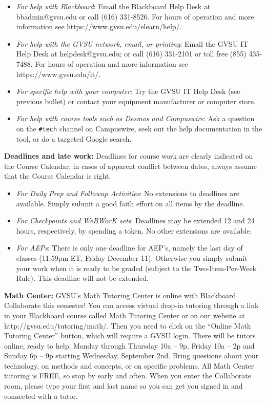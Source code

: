 \documentclass[]{article}
\providecommand{\tightlist}{%
  \setlength{\itemsep}{0pt}\setlength{\parskip}{0pt}}
\begin{document}
\begin{itemize}
\tightlist
\item
  \emph{For help with Blackboard}: Email the Blackboard Help Desk at
  bbadmin@gvsu.edu or call (616) 331-8526. For hours of operation and
  more information see https://www.gvsu.edu/elearn/help/.
\item
  \emph{For help with the GVSU network, email, or printing}: Email the
  GVSU IT Help Desk at helpdesk@gvsu.edu; or call (616) 331-2101 or toll
  free (855) 435-7488. For hours of operation and more information see
  https://www.gvsu.edu/it/.
\item
  \emph{For specific help with your computer}: Try the GVSU IT Help Desk
  (see previous bullet) or contact your equipment manufacturer or
  computer store.
\item
  \emph{For help with course tools such as Desmos and Campuswire}: Ask a
  question on the \texttt{\#tech} channel on Campuswire, seek out the
  help documentation in the tool, or do a targeted Google search.
\end{itemize}

\textbf{Deadlines and late work:} Deadlines for course work are clearly
indicated on the Course Calendar; in cases of apparent conflict between
dates, always assume that the Course Calendar is right.

\begin{itemize}
\tightlist
\item
  \emph{For Daily Prep and Followup Activities}: No extensions to
  deadlines are available. Simply submit a good faith effort on all
  items by the deadline.
\item
  \emph{For Checkpoints and WeBWorK sets}: Deadlines may be extended 12
  and 24 hours, respectively, by spending a token. No other extensions
  are available.
\item
  \emph{For AEPs}: There is only one deadline for AEP's, namely the last
  day of classes (11:59pm ET, Friday December 11). Otherwise you simply
  submit your work when it is ready to be graded (subject to the
  Two-Item-Per-Week Rule). This deadline will not be extended.
\end{itemize}

\textbf{Math Center:} GVSU's Math Tutoring Center is online with
Blackboard Collaborate this semester! You can access virtual drop-in
tutoring through a link in your Blackboard course called Math Tutoring
Center or on our website at http://gvsu.edu/tutoring/math/. Then you
need to click on the ``Online Math Tutoring Center'' button, which will
require a GVSU login. There will be tutors online, ready to help, Monday
through Thursday 10a -- 9p, Friday 10a -- 2p and Sunday 6p -- 9p
starting Wednesday, September 2nd. Bring questions about your
technology, on methods and concepts, or on specific problems. All Math
Center tutoring is FREE, so stop by early and often. When you enter the
Collaborate room, please type your first and last name so you can get
you signed in and connected with a tutor.
\end{document}
